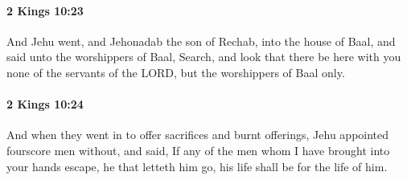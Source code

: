 		\paragraph{2 Kings 10:23} %
			\label{2KINGS-10-23}

			And Jehu went, and Jehonadab the son of Rechab, into the house of Baal, and said unto the worshippers of Baal, Search, and look that there be here with you none of the servants of the LORD, but the worshippers of Baal only.


		\paragraph{2 Kings 10:24} %
			\label{2KINGS-10-24}

			And when they went in to offer sacrifices and burnt offerings, Jehu appointed fourscore men without, and said, If any of the men whom I have brought into your hands escape, he that letteth him go, his life shall be for the life of him.

